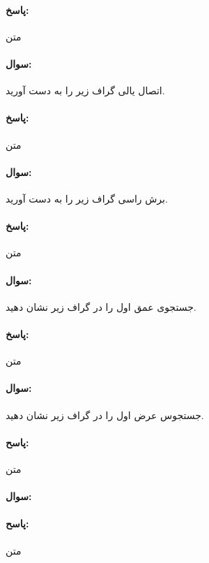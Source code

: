 \documentclass[a4paper,10pt]{article}
\begin{document}
    \paragraph{پاسخ:} متن

    \noindent\hrulefill

    \paragraph{سوال:} اتصال یالی گراف زیر را به دست آورید.

    \paragraph{پاسخ:} متن

    \noindent\hrulefill

    \paragraph{سوال:} برش راسی گراف زیر را به دست آورید.

    \paragraph{پاسخ:} متن

    \noindent\hrulefill

    \paragraph{سوال:} جستجوی عمق اول را در گراف زیر نشان دهید.

    \paragraph{پاسخ:} متن

    \noindent\hrulefill

    \paragraph{سوال:} جستجوس عرض اول را در گراف زیر نشان دهید.

    \paragraph{پاسح:} متن

    \noindent\hrulefill

    \paragraph{سوال:} 

    \paragraph{پاسح:} متن
\end{document}
